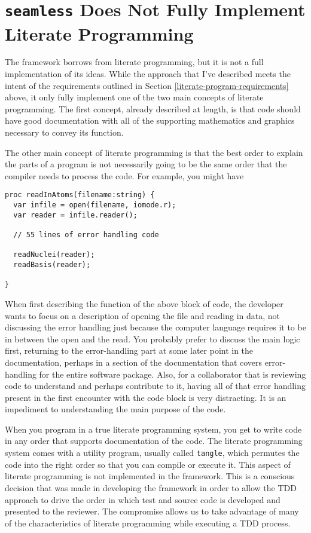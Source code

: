 \section{\texttt{seamless} Does Not Fully Implement Literate Programming}

The \seamless framework borrows from literate programming, but it is not a full implementation of its
ideas.  While the approach that I've described meets the intent of the requirements outlined in Section 
\ref{literate-program-requirements} above, it only fully implement one of the two main concepts of
literate programming.\cite{knuth}
The first concept, already described at length, is that code should have good documentation with all of the
supporting mathematics and graphics necessary to convey its function.

The other main concept of literate programming is that the best order to explain the parts of a program 
is not necessarily going to be the same order that the compiler needs to process the code. 
For example, you might have

\begin{verbatim}
proc readInAtoms(filename:string) {
  var infile = open(filename, iomode.r);
  var reader = infile.reader();

  // 55 lines of error handling code

  readNuclei(reader);
  readBasis(reader);

}
\end{verbatim}

When first describing the function of the above block of code, the developer wants to focus on a description of 
opening the file 
and reading in data, not discussing the error handling just because the computer language requires it to be in 
between the open and the read. You probably prefer to discuss the main logic first, returning to the error-handling 
part at some later point in the documentation, perhaps in a section of the documentation that covers error-handling
for the entire software package.
Also, for a collaborator that is reviewing code to understand and perhaps contribute to it, having all of that
error handling present in the first encounter with the code block is very distracting. It is an impediment to 
understanding the main purpose of the code.

When you program in a true literate programming system, you 
get to write code in any order that supports documentation of the code. The literate programming system 
comes with a utility program, 
usually called \lstinline{tangle}, which permutes the code into the right order so that you can compile or execute it.
This aspect of literate programming is not implemented in the \seamless framework. This is a conscious decision 
that was made in developing the framework in order to allow the 
TDD approach to drive the order in which test and source code is developed and presented to the
reviewer.  The compromise allows us to take advantage of many of the characteristics of literate programming while
executing a TDD process.

